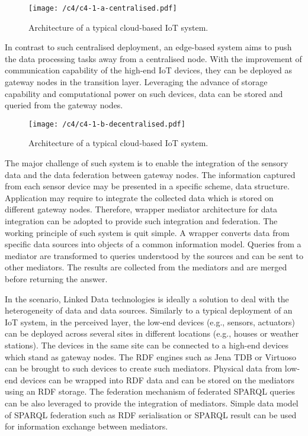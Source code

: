 \begin{figure}[ht!]
    \centering
    \texttt{[image: /c4/c4-1-a-centralised.pdf]}
    \caption{Architecture of a typical cloud-based IoT system.}
    \label{fig:4-1-a-centralised}
\end{figure}

In contrast to such centralised deployment, an edge-based system aims to push the data processing tasks away from a centralised node.
With the improvement of communication capability of the high-end IoT devices, they can be deployed as gateway nodes in the transition layer. 
Leveraging the advance of storage capability and computational power on such devices, data can be stored and queried from the gateway nodes.

\begin{figure}[ht!]
    \centering
    \texttt{[image: /c4/c4-1-b-decentralised.pdf]}
    \caption{Architecture of a typical cloud-based IoT system.}
    \label{fig:4-1-b-decentralised}
\end{figure}

The major challenge of such system is to enable the integration of the sensory data and the data federation between gateway nodes.
The information captured from each sensor device may be presented in a specific scheme, data structure.
Application may require to integrate the collected data which is stored on different gateway nodes.
Therefore, wrapper mediator architecture for data integration can be adopted to provide such integration and federation.
The working principle of such system is quit simple.
A wrapper converts data from specific data sources into objects of a common information model.
Queries from a mediator are transformed to queries understood by the sources and can be sent to other mediators.
The results are collected from the mediators and are merged before returning the answer.

In the scenario, Linked Data technologies is ideally a solution to deal with the heterogeneity of data and data sources.
Similarly to a typical deployment of an IoT system, in the perceived layer, 
the low-end devices (e.g., sensors, actuators) can be deployed across several sites in different locations (e.g., houses or weather stations).
The devices in the same site can be connected to a high-end devices which stand as gateway nodes. 
The RDF engines such as Jena TDB or Virtuoso can be brought to such devices to create such mediators. 
Physical data from low-end devices can be wrapped into RDF data and can be stored on the mediators using an RDF storage.
The federation mechanism of federated SPARQL queries can be also leveraged to provide the integration of mediators.
Simple data model of SPARQL federation such as RDF serialisation or SPARQL result can be used for information exchange between mediators.

